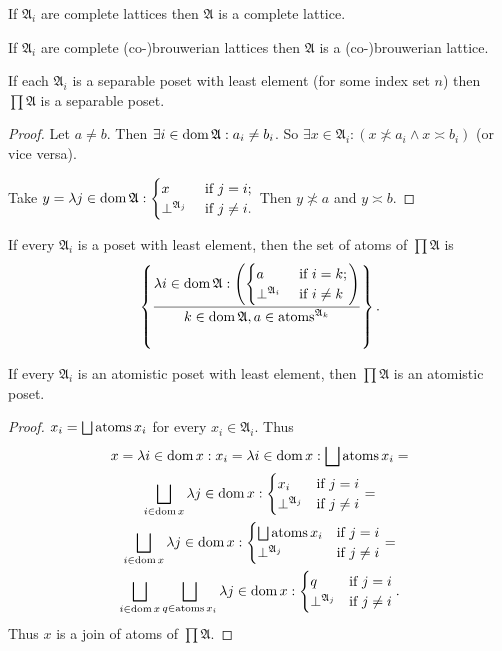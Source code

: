 \begin{cor}
If $\mathfrak{A}_{i}$ are complete lattices then $\mathfrak{A}$
is a complete lattice.\end{cor}
\begin{obvious}
If $\mathfrak{A}_{i}$ are complete (co-)brouwerian lattices then
$\mathfrak{A}$ is a (co-)brouwerian lattice.\end{obvious}
\begin{prop}
If each $\mathfrak{A}_{i}$ is a separable poset with least element
(for some index set $n$) then $\prod\mathfrak{A}$ is a separable
poset.\end{prop}
\begin{proof}
Let $a\neq b$. Then $\exists i\in\operatorname{dom}\mathfrak{A}:a_{i}\neq b_{i}$.
So $\exists x\in\mathfrak{A}_{i}:(x\nasymp a_{i}\wedge x\asymp b_{i})$
(or vice versa).

Take $y=\lambda j\in\operatorname{dom}\mathfrak{A}:\begin{cases}x&\text{ if }j=i;\\\bot^{\mathfrak{A}_j}&\text{ if }j\ne i.\end{cases}$
Then $y\nasymp a$ and $y\asymp b$.\end{proof}
\begin{obvious}
If every $\mathfrak{A}_{i}$ is a poset with least element,
then the set of atoms of $\prod\mathfrak{A}$ is
\[
\left\{ \frac{\lambda i\in\operatorname{dom}\mathfrak{A}:\left(\begin{cases}a&\text{ if }i=k;\\\bot^{\mathfrak{A}_i}&\text{ if }i\ne k\end{cases}\right)}{k\in\operatorname{dom}\mathfrak{A}, a\in\operatorname{atoms}^{\mathfrak{A}_{k}}}\right\}.
\]
\end{obvious}
\begin{prop}
If every $\mathfrak{A}_{i}$ is an atomistic poset with least element, then $\prod\mathfrak{A}$ is an atomistic poset.\end{prop}
\begin{proof}
$x_{i}=\bigsqcup\atoms x_{i}$ for every $x_{i}\in\mathfrak{A}_{i}$.
Thus
\begin{multline*}
x=\mylambda i{\dom x}{x_{i}}=
\mylambda i{\dom x}{\bigsqcup\atoms x_{i}}=\\
\bigsqcup_{i\in\dom x}\mylambda j{\dom x}{\begin{cases}
x_{i} & \text{if }j=i\\
\bot^{\mathfrak{A}_j} & \text{if }j\ne i
\end{cases}} = \\
\bigsqcup_{i\in\dom x}\mylambda j{\dom x}{\begin{cases}
\bigsqcup\atoms x_{i} & \text{if }j=i\\
\bot^{\mathfrak{A}_j} & \text{if }j\ne i
\end{cases}} =\\
\bigsqcup_{i\in\dom x}\bigsqcup_{q\in\atoms x_i}\mylambda j{\dom x}{\begin{cases}
q & \text{if }j=i\\
\bot^{\mathfrak{A}_j} & \text{if }j\ne i
\end{cases}}.
\end{multline*}
Thus $x$ is a join of atoms of $\prod\mathfrak{A}$.\end{proof}
